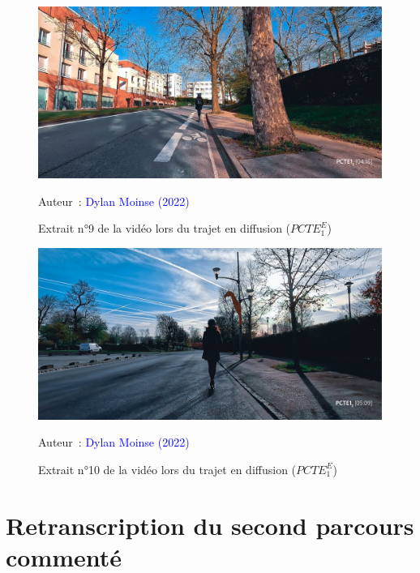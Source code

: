     \begin{figure}[h!]\vspace*{4pt}
        \caption*{Extrait n°9 de la vidéo lors du trajet en diffusion (\(PCTE^{E}_{1}\))}
        \centerline{\includegraphics[width=0.75\columnwidth]{src/Figures/Annexes/Extrait_Video_PCTE1_Egress_9.jpg}}
        \vspace{5pt}
        \begin{flushright}\scriptsize{
        Auteur~: \textcolor{blue}{Dylan Moinse (2022)}
        }\end{flushright}
    \end{figure}

    \begin{figure}[h!]\vspace*{4pt}
        \caption*{Extrait n°10 de la vidéo lors du trajet en diffusion (\(PCTE^{E}_{1}\))}
        \centerline{\includegraphics[width=0.75\columnwidth]{src/Figures/Annexes/Extrait_Video_PCTE1_Egress_10.jpg}}
        \vspace{5pt}
        \begin{flushright}\scriptsize{
        Auteur~: \textcolor{blue}{Dylan Moinse (2022)}
        }\end{flushright}
    \end{figure}

    \newpage
\section{Retranscription du second parcours commenté}
    \label{annexes:retranscription-pcte2}

